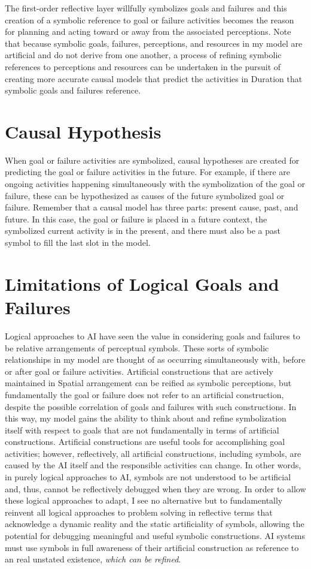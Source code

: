 The first-order reflective layer willfully symbolizes goals and
failures and this creation of a symbolic reference to goal or failure
activities becomes the reason for planning and acting toward or away
from the associated perceptions.  Note that because symbolic goals,
failures, perceptions, and resources in my model are artificial and do
not derive from one another, a process of refining symbolic references
to perceptions and resources can be undertaken in the pursuit of
creating more accurate causal models that predict the activities in
Duration that symbolic goals and failures reference.

\section{Causal Hypothesis}

When goal or failure activities are symbolized, causal hypotheses are
created for predicting the goal or failure activities in the future.
For example, if there are ongoing activities happening simultaneously
with the symbolization of the goal or failure, these can be
hypothesized as causes of the future symbolized goal or failure.
Remember that a causal model has three parts: present cause, past, and
future.  In this case, the goal or failure is placed in a future
context, the symbolized current activity is in the present, and there
must also be a past symbol to fill the last slot in the model.

\section{Limitations of Logical Goals and Failures}

Logical approaches to AI have seen the value in considering goals and
failures to be relative arrangements of perceptual symbols.  These
sorts of symbolic relationships in my model are thought of as
occurring simultaneously with, before or after goal or failure
activities.  Artificial constructions that are actively maintained in
Spatial arrangement can be reified as symbolic perceptions, but
fundamentally the goal or failure does not refer to an artificial
construction, despite the possible correlation of goals and failures
with such constructions.  In this way, my model gains the ability to
think about and refine symbolization itself with respect to goals that
are not fundamentally in terms of artificial constructions.
Artificial constructions are useful tools for accomplishing goal
activities; however, reflectively, all artificial constructions,
including symbols, are caused by the AI itself and the responsible
activities can change.  In other words, in purely logical approaches
to AI, symbols are not understood to be artificial and, thus, cannot
be reflectively debugged when they are wrong.  In order to allow these
logical approaches to adapt, I see no alternative but to fundamentally
reinvent all logical approaches to problem solving in reflective terms
that acknowledge a dynamic reality and the static artificiality of
symbols, allowing the potential for debugging meaningful and useful
symbolic constructions.  AI systems must use symbols in full awareness
of their artificial construction as reference to an real unstated
existence, \emph{which can be refined}.

